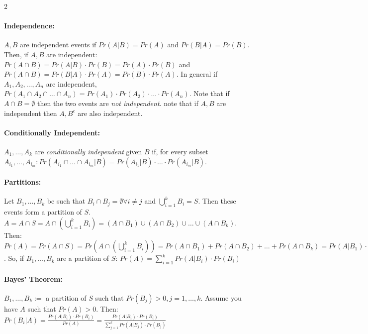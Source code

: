 \documentclass{article}[10pt]
\begin{document}
\begin{multicols}{2}
        \paragraph*{Independence:}
            $A, B$ are independent events if $Pr(A|B) = Pr(A)$ and $Pr(B|A) = Pr(B)$. Then, if $A, B$ are independent: $Pr(A \cap B) = Pr(A|B) \cdot Pr(B) = Pr(A) \cdot Pr(B)$ and $Pr(A \cap B) = Pr(B | A) \cdot Pr(A) = Pr(B) \cdot Pr(A)$. In general if $A_1, A_2, \ldots, A_n$ are independent, $Pr(A_1 \cap A_2 \cap \ldots \cap A_n) = Pr(A_1) \cdot Pr(A_2) \cdot \ldots \cdot Pr(A_n)$. Note that if $A \cap B = \emptyset$ then the two events are \textit{not independent}. note that if $A, B$ are independent then $A, B^c$ are also independent.
        
        \paragraph*{Conditionally Independent: } 
            $A_1, \ldots, A_k$ are \textit{conditionally independent} given $B$ if, for every subset $A_{i_1}, \ldots, A_{i_m}: Pr(A_{i_1} \cap \ldots \cap A_{i_m} | B) = Pr(A_{i_1} | B) \cdot \ldots \cdot Pr(A_{i_m} | B)$.
        
        \paragraph*{Partitions: }
            Let $B_1, \ldots, B_k$ be such that $B_i \cap B_j = \emptyset \forall i \neq j$ and $\bigcup\limits_{i = 1}^{k} B_i = S$. Then these events form a partition of $S$. \\
            $A = A \cap S = A \cap \left(\bigcup\limits_{i = 1}^{k} B_i\right) = (A \cap B_1) \cup (A \cap B_2) \cup \ldots \cup (A \cap B_k)$. Then: $Pr(A) = Pr(A \cap S) = Pr(A \cap \left(\bigcup\limits_{i = 1}^{k} B_i \right)) = Pr(A \cap B_1) + Pr(A \cap B_2) + \ldots + Pr(A \cap B_k) = Pr(A|B_1) \cdot Pr(B_1) + Pr(A|B_2)\cdot Pr(B_2) + \ldots + Pr(A|B_k) \cdot Pr(B_k) = \sum\limits_{i=1}^{k} Pr(A|B_i)\cdot Pr(B_i)$. So, if $B_1, \ldots, B_k$ are a partition of $S$: $Pr(A) = \sum\limits_{i=1}^{k}Pr(A|B_i)\cdot Pr(B_i)$
        
        \paragraph*{Bayes' Theorem:}
            $B_1, \ldots, B_k :=$ a partition of $S$ such that $Pr(B_j) > 0, j = 1, \ldots, k$. Assume you have $A$ such that $Pr(A) > 0$. Then: $Pr(B_i|A) = \frac{Pr(A|B_i) \cdot Pr(B_i)}{Pr(A)} = \frac{Pr(A|B_i) \cdot Pr(B_i)}{\sum\limits_{j=1}^{k}Pr(A|B_j) \cdot Pr(B_j)}$
        \end{multicols}
\end{document}
